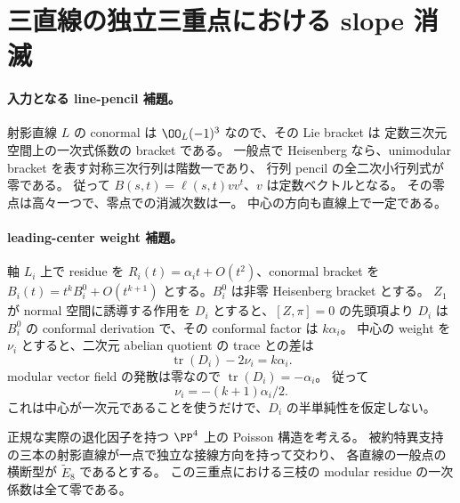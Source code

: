 \section{三直線の独立三重点における slope 消滅}

\paragraph{入力となる line-pencil 補題。}
射影直線 $L$ の conormal は $\OO_L(-1)^3$ なので、その Lie bracket は
定数三次元空間上の一次式係数の bracket である。
一般点で Heisenberg なら、unimodular bracket を表す対称三次行列は階数一であり、
行列 pencil の全二次小行列式が零である。
従って $B(s,t)=\ell(s,t)vv^t$、$v$ は定数ベクトルとなる。
その零点は高々一つで、零点での消滅次数は一。
中心の方向も直線上で一定である。

\paragraph{leading-center weight 補題。}
軸 $L_i$ 上で residue を $R_i(t)=\alpha_i t+O(t^2)$、conormal bracket を
$B_i(t)=t^k B_i^0+O(t^{k+1})$ とする。$B_i^0$ は非零 Heisenberg bracket とする。
$Z_1$ が normal 空間に誘導する作用を $D_i$ とすると、$[Z,\pi]=0$ の先頭項より
$D_i$ は $B_i^0$ の conformal derivation で、その conformal factor は $k\alpha_i$。
中心の weight を $\nu_i$ とすると、二次元 abelian quotient の trace との差は
\[
 \operatorname{tr}(D_i)-2\nu_i=k\alpha_i.
\]
modular vector field の発散は零なので $\operatorname{tr}(D_i)=-\alpha_i$。
従って
\[
 \boxed{\nu_i=-(k+1)\alpha_i/2.}
 \tag{LC}
\]
これは中心が一次元であることを使うだけで、$D_i$ の半単純性を仮定しない。

\begin{proposition}
正規な実際の退化因子を持つ $\PP^4$ 上の Poisson 構造を考える。
被約特異支持の三本の射影直線が一点で独立な接線方向を持って交わり、
各直線の一般点の横断型が $\widetilde E_8$ であるとする。
この三重点における三枝の modular residue の一次係数は全て零である。
\end{proposition}

